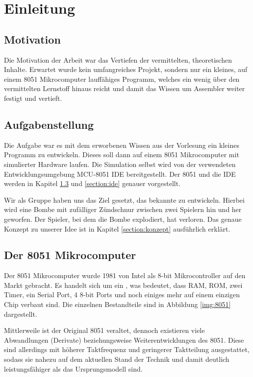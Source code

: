 \chapter{Einleitung}

\section{Motivation}

Die Motivation der Arbeit war das Vertiefen der vermittelten, theoretischen Inhalte. Erwartet wurde kein umfangreiches Projekt, sondern nur ein kleines, auf einem 8051 Mikrocomputer lauffähiges Programm, welches ein wenig über den vermittelten Lernstoff hinaus reicht und damit das Wissen um Assembler\cite{bib:assembler} weiter festigt und vertieft.

\section{Aufgabenstellung}

Die Aufgabe war es mit dem erworbenen Wissen aus der Vorlesung  ein kleines Programm zu entwickeln. Dieses soll dann auf einem 8051 Mikrocomputer mit simulierter Hardware laufen. Die Simulation selbst wird von der verwendeten Entwicklungsumgebung MCU-8051 IDE bereitgestellt. Der 8051 und die IDE werden in Kapitel \ref{section:8051} und \ref{section:ide} genauer vorgestellt.

Wir als Gruppe haben uns das Ziel gesetzt, das bekannte  zu entwickeln. Hierbei wird eine Bombe mit zufälliger Zündschnur zwischen zwei Spielern hin und her geworfen. Der Spieler, bei dem die Bombe explodiert, hat verloren. Das genaue Konzept zu unserer Idee ist in Kapitel \ref{section:konzept} ausführlich erklärt.

\section{Der 8051 Mikrocomputer} \label{section:8051}

Der 8051 Mikrocomputer wurde 1981 von Intel als 8-bit Mikrocontroller auf den Markt gebracht. Es handelt sich um ein , was bedeutet, dass RAM, ROM, zwei Timer, ein Serial Port, 4 8-bit Ports und noch einiges mehr auf einem einzigen Chip verbaut sind. Die einzelnen Bestandteile sind in Abbildung \ref{img:8051} dargestellt.\cite{bib:8051}

Mittlerweile ist der Original 8051 veraltet, dennoch existieren viele Abwandlungen (Derivate) beziehungsweise Weiterentwicklungen des 8051. Diese sind allerdings mit höherer Taktfrequenz und geringerer Taktteilung ausgestattet, sodass sie nahezu auf dem aktuellen Stand der Technik und damit deutlich leistungsfähiger als das Ursprungsmodell sind.\cite{bib:8051_2}

